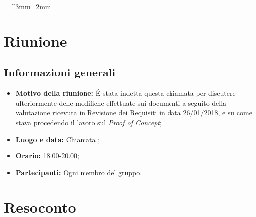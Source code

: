 \documentclass[VER-2018-05-02.tex]{subfiles}
\begin{document}
\tabulinesep = ^3mm_2mm
\chapter{Riunione}
\section{Informazioni generali}
\begin{itemize}
	\item \textbf{Motivo della riunione:} \'{E} stata indetta questa chiamata  per discutere ulteriormente delle modifiche effettuate sui documenti a seguito della valutazione ricevuta in Revisione dei Requisiti in data 26/01/2018, e su come stava procedendo il lavoro sul \textit{Proof of Concept};
	\item \textbf{Luogo e data:} Chiamata ;
	\item \textbf{Orario:} 18.00-20.00;
	\item \textbf{Partecipanti:} Ogni membro del gruppo.
\end{itemize}


\chapter{Resoconto}
\end{document}
